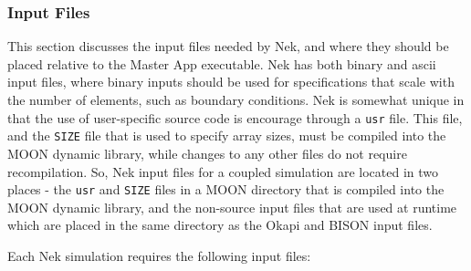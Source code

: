 \documentclass[10pt]{article}
\numberwithin{equation}{section} %
\begin{document}
\subsubsection{Input Files}
This section discusses the input files needed by Nek, and where they should be placed relative to the Master App executable. Nek has both binary and ascii input files, where binary inputs should be used for specifications that scale with the number of elements, such as boundary conditions. Nek is somewhat unique in that the use of user-specific source code is encourage through a {\tt usr} file. This file, and the {\tt SIZE} file that is used to specify array sizes, must be compiled into the MOON dynamic library, while changes to any other files do not require recompilation. So, Nek input files for a coupled simulation are located in two places - the {\tt usr} and {\tt SIZE} files in a MOON directory that is compiled into the MOON dynamic library, and the non-source input files that are used at runtime which are placed in the same directory as the Okapi and BISON input files.

Each Nek simulation requires the following input files:
\end{document}
